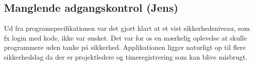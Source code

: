 \subsection{Manglende adgangskontrol (Jens)}
Ud fra programspecifikationen var det gjort klart at et vist sikkerhedsniveau, som fx login med kode, ikke var ønsket. Det var for os en mærkelig oplevelse at skulle programmere uden tanke på sikkerhed. Applikationen ligger naturligt op til flere sikkerhedslag da der er projektledere og timeregistrering som kan blive misbrugt. 